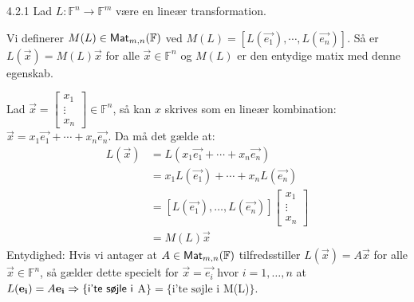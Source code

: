 \begin{saetning}{4.2.1}
	Lad $L: \mathbb{F}^n \rightarrow \mathbb{F}^m$ være en lineær
	transformation.	

	Vi definerer $M(L) \in \textsf{Mat}_{m,n}(\mathbb{F})$ ved $M(L) = [L(\vec{e_1}), 
	\cdots, L(\vec{e_n})]$.
	Så er $L(\vec{x}) = M(L)\vec{x}$ for alle $\vec{x} \in \mathbb{F}^n$ og 
	$M(L)$ er den entydige matix med denne egenskab.
\end{saetning}

\begin{bevis}
	Lad $\vec{x} = \begin{bmatrix}x_1\\ \vdots \\ x_n\end{bmatrix} \in 
	\mathbb{F}^n$, så kan $x$ skrives som en lineær kombination: $\vec{x} = 
	x_1\vec{e_1} + \cdots + x_n\vec{e_n}$. Da må det gælde at:
	\begin{align*}	
		L(\vec{x}) &= L(x_1\vec{e_1} + \dotsb + x_n\vec{e_n}) \\
				   &= x_1L(\vec{e_1}) + \dotsb + x_nL(\vec{e_n}) \\
				   &= [L(\vec{e_1}), \dotsc, L(\vec{e_n})]
					\begin{bmatrix}
						x_1 \\
						\vdots \\
						x_n
					\end{bmatrix} \\
				   &= M(L)\vec{x}
	\end{align*}
	Entydighed: Hvis vi antager at $A \in \textsf{Mat}_{m,n}(\mathbb{F})$ 
	tilfredsstiller $L(\vec{x}) = A\vec{x}$ for alle $\vec{x} \in 
	\mathbb{F}^n$, så gælder dette specielt for $\vec{x} = \vec{e_i}$ hvor
	$i = 1, \dotsc, n$ at $L(\mathbf{e_i}) = A\mathbf{e_i} \Rightarrow \{\textsf{i'te søjle i } 
	$A$\} = \{\text{i'te søjle i }$M(L)$\}$.
\end{bevis}
